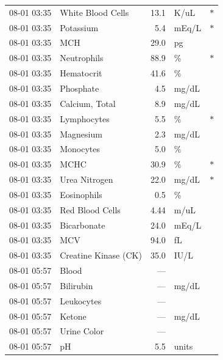 \documentclass[12pt, a4paper]{article}
\begin{document}
{\begin{longtable}{l p{4.5cm} r l c}
08-01 03:35 & White Blood Cells              & 13.1   & K/uL   & $*$ \\
08-01 03:35 & Potassium                      & 5.4    & mEq/L  & $*$ \\
08-01 03:35 & MCH                            & 29.0   & pg     &     \\
08-01 03:35 & Neutrophils                    & 88.9   & \%     & $*$ \\
08-01 03:35 & Hematocrit                     & 41.6   & \%     &     \\
08-01 03:35 & Phosphate                      & 4.5    & mg/dL  &     \\
08-01 03:35 & Calcium, Total                 & 8.9    & mg/dL  &     \\
08-01 03:35 & Lymphocytes                    & 5.5    & \%     & $*$ \\
08-01 03:35 & Magnesium                      & 2.3    & mg/dL  &     \\
08-01 03:35 & Monocytes                      & 5.0    & \%     &     \\
08-01 03:35 & MCHC                           & 30.9   & \%     & $*$ \\
08-01 03:35 & Urea Nitrogen                  & 22.0   & mg/dL  & $*$ \\
08-01 03:35 & Eosinophils                    & 0.5    & \%     &     \\
08-01 03:35 & Red Blood Cells                & 4.44   & m/uL   &     \\
08-01 03:35 & Bicarbonate                    & 24.0   & mEq/L  &     \\
08-01 03:35 & MCV                            & 94.0   & fL     &     \\
08-01 03:35 & Creatine Kinase (CK)           & 35.0   & IU/L   &     \\
08-01 05:57 & Blood                          & ---    &        &     \\
08-01 05:57 & Bilirubin                      & ---    & mg/dL  &     \\
08-01 05:57 & Leukocytes                     & ---    &        &     \\
08-01 05:57 & Ketone                         & ---    & mg/dL  &     \\
08-01 05:57 & Urine Color                    & ---    &        &     \\
08-01 05:57 & pH                             & 5.5    & units  &     \\

\end{longtable}}
\end{document}
